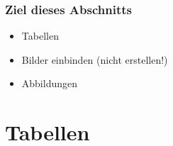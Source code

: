 
\subtitle{Tabellen und Bilder}
\date{2017-05-16}



\begin{frame}
  \frametitle{Ziel dieses Abschnitts}

  \begin{itemize}
  \item Tabellen
  \item Bilder einbinden (nicht erstellen!)
  \item Abbildungen
  \end{itemize}

\end{frame}

\section{Tabellen}

